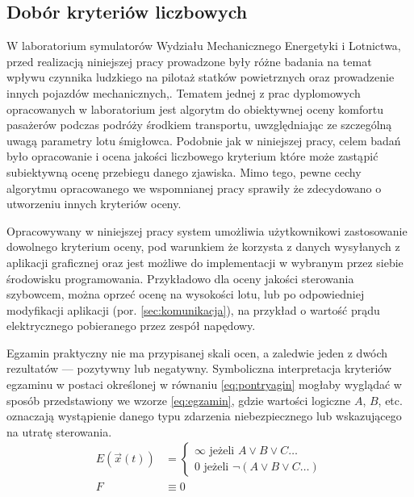 \subsection{Dobór kryteriów liczbowych}
W laboratorium symulatorów Wydziału Mechanicznego Energetyki i Lotnictwa, przed realizacją niniejszej pracy prowadzone były różne badania na temat wpływu czynnika ludzkiego na pilotaż statków powietrznych oraz prowadzenie innych pojazdów mechanicznych\cite{kopyt2017},\cite{kopyt2019}. Tematem jednej z prac dyplomowych opracowanych w laboratorium\cite{tomaszewska2019} jest algorytm do obiektywnej oceny komfortu pasażerów podczas podróży środkiem transportu, uwzględniając ze szczególną uwagą parametry lotu śmigłowca. Podobnie jak w niniejszej pracy, celem badań było opracowanie i ocena jakości liczbowego kryterium które może zastąpić subiektywną ocenę przebiegu danego zjawiska. Mimo tego, pewne cechy algorytmu opracowanego we wspomnianej pracy sprawiły że zdecydowano o utworzeniu innych kryteriów oceny.

Opracowywany w niniejszej pracy system umożliwia użytkownikowi zastosowanie dowolnego kryterium oceny, pod warunkiem że korzysta z  danych wysyłanych z aplikacji graficznej oraz jest możliwe do implementacji w wybranym przez siebie środowisku programowania. Przykładowo dla oceny jakości sterowania szybowcem, można oprzeć ocenę na wysokości lotu, lub po odpowiedniej modyfikacji aplikacji (por. \ref{sec:komunikacja}), na przykład o wartość prądu elektrycznego pobieranego przez zespół napędowy.

Egzamin praktyczny nie ma przypisanej skali ocen, a zaledwie jeden z dwóch rezultatów --- pozytywny lub negatywny. Symboliczna interpretacja kryteriów egzaminu w postaci określonej w równaniu \ref{eq:pontryagin} mogłaby wyglądać w sposób przedstawiony we wzorze \ref{eq:egzamin}, gdzie wartości logiczne $ A $, $ B $, etc. oznaczają wystąpienie danego typu zdarzenia niebezpiecznego lub wskazującego na utratę sterowania.
\begin{align}
    \label{eq:egzamin}
    E\left( \vec{x}(t) \right) &=
    \left\{
        \begin{array}{ll}
            \infty \mbox{ jeżeli } A \lor B \lor C \dots \\
            0 \mbox{ jeżeli } \neg ( A \lor B \lor C \dots)
        \end{array}
    \right.
    \\
    F & \equiv 0
\end{align}

